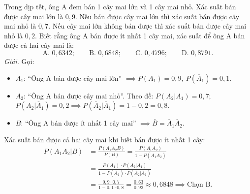 \begin{vidu}
Trong dịp tết, ông A đem bán 1 cây mai lớn và 1 cây mai nhỏ. Xác suất bán được cây mai lớn là $0{,}9$. Nếu bán được cây mai lớn thì xác suất bán được cây mai nhỏ là $0{,}7$. Nếu cây mai lớn không bán được thì xác suất bán được cây mai nhỏ là $0{,}2$. Biết rằng ông A bán được ít nhất 1 cây mai, xác suất để ông A bán được cả hai cây mai là:
\[
\text{A. } 0{,}6342; \qquad \text{B. } 0{,}6848; \qquad \text{C. } 0{,}4796; \qquad \text{D. } 0{,}8791.
\]
\textit{Giải.} Gọi:
\begin{itemize}
    \item $A_1$: ``Ông A bán được cây mai lớn'' $\implies P(A_1) = 0{,}9,\ P(\overline{A}_1) = 0{,}1$.
    \item $A_2$: ``Ông A bán được cây mai nhỏ''.
    Theo đề: $P(A_2 | A_1) = 0{,}7$; $P(A_2 | \overline{A}_1) = 0{,}2 \implies P(\overline{A}_2 | \overline{A}_1) = 1 - 0{,}2 = 0{,}8$.
    \item $B$: ``Ông A bán được ít nhất 1 cây mai'' $\implies \overline{B} = \overline{A}_1 \overline{A}_2$.
\end{itemize}
Xác suất bán được cả hai cây mai khi biết bán được ít nhất 1 cây:
\begin{align*}
P(A_1 A_2 | B) &= \frac{P(A_1 A_2 B)}{P(B)} = \frac{P(A_1 A_2)}{1 - P(\overline{A}_1 \overline{A}_2)} \\
               &= \frac{P(A_1) \cdot P(A_2 | A_1)}{1 - P(\overline{A}_1) \cdot P(\overline{A}_2 | \overline{A}_1)} \\
               &= \frac{0{,}9 \cdot 0{,}7}{1 - 0{,}1 \cdot 0{,}8} = \frac{0{,}63}{0{,}92} \approx 0{,}6848 \implies \text{Chọn B.}
\end{align*}
\end{vidu}


